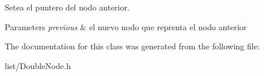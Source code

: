 Setea el puntero del nodo anterior. 


\begin{DoxyParams}{Parameters}
{\em previous} & el nuevo nodo que reprenta el nodo anterior \\
\hline
\end{DoxyParams}


The documentation for this class was generated from the following file\-:\begin{DoxyCompactItemize}
\item 
list/Double\-Node.\-h\end{DoxyCompactItemize}
